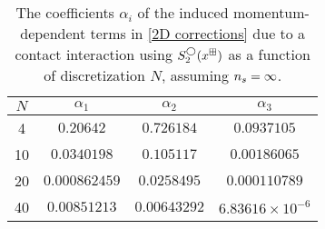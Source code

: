 \begin{table}
    \caption{The coefficients $\alpha_i$ of the induced momentum-dependent terms in \eqref{2D corrections} due to a contact interaction using $S^\bigcirc_2(x^\boxplus)$ as a function of discretization $N$, assuming ${n_s}=\infty$.
    }
    \label{tab:induced terms in 2 d}
    \begin{tabular}{c|ccc}
    $N$ &   $\alpha_1$      &   $\alpha_2$      & $\alpha_3$                \\
    \hline
    4   &   $0.20642$   &   $0.726184$ & $0.0937105$           \\
    10  &   $0.0340198$   &   $0.105117$ & $0.00186065$           \\
    20  &   $0.000862459$   &   $0.0258495$ & $0.000110789$           \\
    40  &   $0.00851213$   &   $0.00643292$ & $6.83616\times10^{-6}$    \\
\end{tabular}
\end{table}

